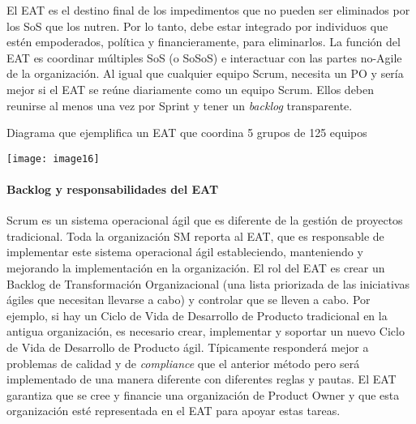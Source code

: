 \documentclass{article} %
\begin{document}
\noindent El EAT es el destino final de los impedimentos que no pueden ser eliminados por los SoS que los nutren. Por lo tanto, debe estar integrado por individuos que est\'{e}n empoderados, pol\'{i}tica y financieramente, para eliminarlos. La funci\'{o}n del EAT es coordinar m\'{u}ltiples SoS (o SoSoS) e interactuar con las partes no-Agile de la organizaci\'{o}n. Al igual que cualquier equipo Scrum, necesita un PO y ser\'{i}a mejor si el EAT se re\'{u}ne diariamente como un equipo Scrum. Ellos deben reunirse al menos una vez por Sprint y tener un \textit{backlog }transparente.

\noindent Diagrama que ejemplifica un EAT que coordina 5 grupos de 125 equipos

\noindent 

\noindent \texttt{[image: image16]}

\noindent 

\noindent 

\noindent 
\paragraph{Backlog y responsabilidades del EAT }

\noindent 

\noindent Scrum es un sistema operacional \'{a}gil que es diferente de la gesti\'{o}n de proyectos tradicional. Toda la organizaci\'{o}n SM reporta al EAT, que es responsable de implementar este sistema operacional \'{a}gil estableciendo, manteniendo y mejorando la implementaci\'{o}n en la organizaci\'{o}n. El rol del EAT es crear un Backlog de Transformaci\'{o}n Organizacional (una lista priorizada de las iniciativas \'{a}giles que necesitan llevarse a cabo) y controlar que se lleven a cabo. Por ejemplo, si hay un Ciclo de Vida de Desarrollo de Producto tradicional en la antigua organizaci\'{o}n, es necesario crear, implementar y soportar un nuevo Ciclo de Vida de Desarrollo de Producto \'{a}gil. T\'{i}picamente responder\'{a} mejor a problemas de calidad y de \textit{compliance} que el anterior m\'{e}todo pero ser\'{a} implementado de una manera diferente con diferentes reglas y pautas. El EAT garantiza que se cree y financie una organizaci\'{o}n de Product Owner y que esta organizaci\'{o}n est\'{e} representada en el EAT para apoyar estas tareas.  

\noindent 

\noindent 

\noindent 
\end{document}
